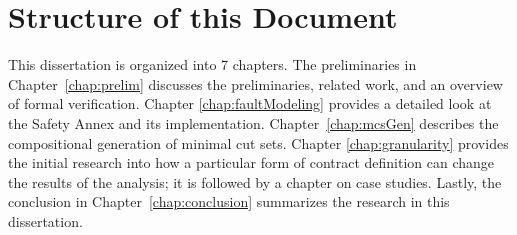 \section{Structure of this Document}
This dissertation is organized into 7 chapters. The preliminaries in Chapter~\ref{chap:prelim} discusses the preliminaries, related work, and an overview of formal verification. Chapter \ref{chap:faultModeling} provides a detailed look at the Safety Annex and its implementation. Chapter~\ref{chap:mcsGen} describes the compositional generation of minimal cut sets. Chapter \ref{chap:granularity} provides the initial research into how a particular form of contract definition can change the results of the analysis; it is followed by a chapter on case studies. Lastly, the conclusion in Chapter~\ref{chap:conclusion} summarizes the research in this dissertation.











